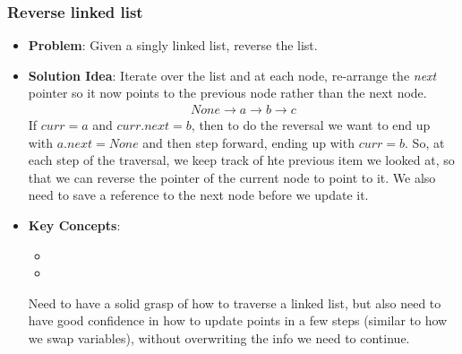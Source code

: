 \documentclass[10pt,a4paper]{article}
\begin{document}
\subsubsection*{Reverse linked list}
\begin{itemize}
\item \textbf{Problem}: Given a singly linked list, reverse the list.
\item \textbf{Solution Idea}: Iterate over the list and at each node, re-arrange the \textit{next} pointer so it now points to the previous node rather than the next node.
\begin{align*}
    None \rightarrow a \rightarrow b \rightarrow c
\end{align*}
If $curr=a$ and $curr.next = b$, then to do the reversal we want to end up with $a.next = None$ and then step forward, ending up with $curr=b$. So, at each step of the traversal, we keep track of hte previous item we looked at, so that we can reverse the pointer of the current node to point to it. We also need to save a reference to the next node before we update it.
\item \textbf{Key Concepts}:
\begin{itemize}
    \item {}
    \item {}
\end{itemize}
Need to have a solid grasp of how to traverse a linked list, but also need to have good confidence in how to update points in a few steps (similar to how we swap variables), without overwriting the info we need to continue.
\end{itemize}
\end{document}
